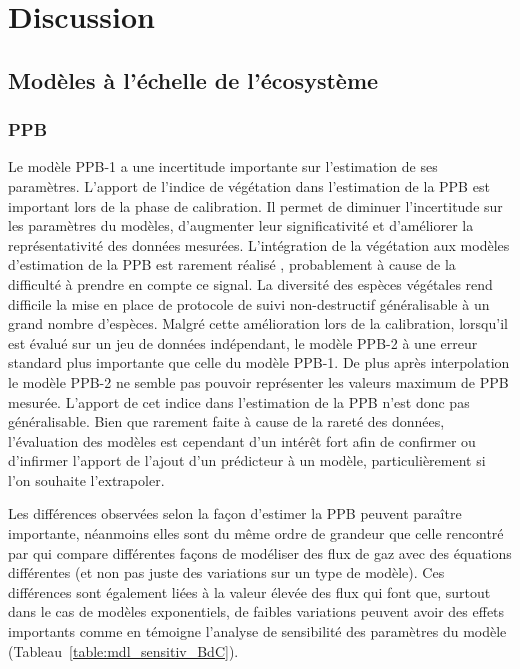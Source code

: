 
\section{Discussion}

\subsection{Modèles à l'échelle de l'écosystème}

\subsubsection{PPB}


Le modèle PPB-1 a une incertitude importante sur l'estimation de ses paramètres.
L'apport de l'indice de végétation dans l'estimation de la PPB est important lors de la phase de calibration.
Il permet de diminuer l'incertitude sur les paramètres du modèles, d'augmenter leur significativité et d'améliorer la représentativité des données mesurées.
L'intégration de la végétation aux modèles d'estimation de la PPB est rarement réalisé \citep{bortoluzzi2006a,gorres2014}, probablement à cause de la difficulté à prendre en compte ce signal.
La diversité des espèces végétales rend difficile la mise en place de protocole de suivi non-destructif généralisable à un grand nombre d'espèces.
Malgré cette amélioration lors de la calibration, lorsqu'il est évalué sur un jeu de données indépendant, le modèle PPB-2 à une erreur standard plus importante que celle du modèle PPB-1.
De plus après interpolation le modèle PPB-2 ne semble pas pouvoir représenter les valeurs maximum de PPB mesurée.
L'apport de cet indice dans l'estimation de la PPB n'est donc pas généralisable.
Bien que rarement faite à cause de la rareté des données, l'évaluation des modèles est cependant d'un intérêt fort afin de confirmer ou d'infirmer l'apport de l'ajout d'un prédicteur à un modèle, particulièrement si l'on souhaite l'extrapoler.

Les différences observées selon la façon d'estimer la PPB peuvent paraître importante, néanmoins elles sont du même ordre de grandeur que celle rencontré par \citet{worrall2009} qui compare différentes façons de modéliser des flux de gaz avec des équations différentes (et non pas juste des variations sur un type de modèle).
Ces différences sont également liées à la valeur élevée des flux qui font que, surtout dans le cas de modèles exponentiels, de faibles variations peuvent avoir des effets importants comme en témoigne l'analyse de sensibilité des paramètres du modèle (Tableau~\ref{table:mdl_sensitiv_BdC}).

